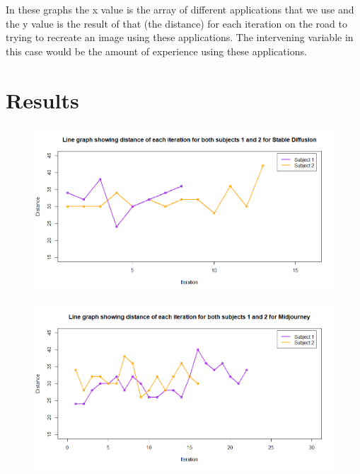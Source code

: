 \documentclass[]{report}
\begin{document}
	In these graphs the x value is the array of different applications that we use and the y value is the result of that (the distance) for each iteration on the road to trying to recreate an image using these applications. The intervening variable in this case would be the amount of experience using these applications.
	
	
	
	\pagebreak
	
	\section{Results}
    
	\begin{figure}[!!htbp]
		\centering
		\includegraphics[width=1\linewidth]{LineGraphStableDiff}
		\caption{}
		\label{fig:linegraphstablediff}
	\end{figure}

\begin{figure}[!htbp]
	\centering
	\includegraphics[width=1\linewidth]{LineGraphMidJ}
	\caption{}
	\label{fig:linegraphmidj}
\end{figure}
\end{document}
